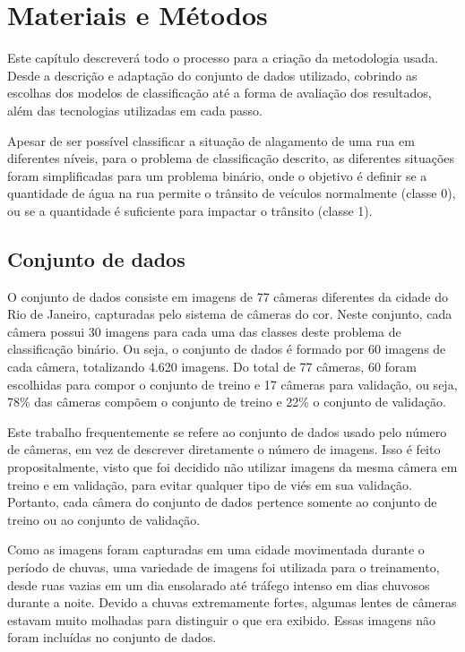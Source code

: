 \chapter{Materiais e Métodos}\label{cap:metodologia}

Este capítulo descreverá todo o processo para a criação da metodologia usada.
Desde a descrição e adaptação do conjunto de dados utilizado, cobrindo as escolhas dos modelos de classificação até a forma de avaliação dos resultados,
além das tecnologias utilizadas em cada passo.

Apesar de ser possível classificar a situação de alagamento de uma rua em diferentes níveis, para o problema de classificação descrito,
as diferentes situações foram simplificadas para um problema binário, onde o objetivo é definir se a quantidade de água na rua permite o trânsito de veículos normalmente (classe 0),
ou se a quantidade é suficiente para impactar o trânsito (classe 1).

\section{Conjunto de dados}\label{sec:dataset}

O conjunto de dados consiste em imagens de 77 câmeras diferentes da cidade do Rio de Janeiro, capturadas pelo sistema de câmeras do \Acrfull{cor}.
Neste conjunto, cada câmera possui 30 imagens para cada uma das classes deste problema de classificação binário.
Ou seja, o conjunto de dados é formado por 60 imagens de cada câmera, totalizando 4.620 imagens.
Do total de 77 câmeras, 60 foram escolhidas para compor o conjunto de treino e 17 câmeras para validação, ou seja, 78\% das câmeras compõem o conjunto de treino e 22\% o conjunto de validação.

Este trabalho frequentemente se refere ao conjunto de dados usado pelo número de câmeras, em vez de descrever diretamente o número de imagens.
Isso é feito propositalmente, visto que foi decidido não utilizar imagens da mesma câmera em treino e em validação, para evitar qualquer tipo de viés em sua validação.
Portanto, cada câmera do conjunto de dados pertence somente ao conjunto de treino ou ao conjunto de validação.

Como as imagens foram capturadas em uma cidade movimentada durante o período de chuvas, uma variedade de imagens foi utilizada para o treinamento,
desde ruas vazias em um dia ensolarado até tráfego intenso em dias chuvosos durante a noite.
Devido a chuvas extremamente fortes, algumas lentes de câmeras estavam muito molhadas para distinguir o que era exibido. Essas imagens não foram incluídas no conjunto de dados.

